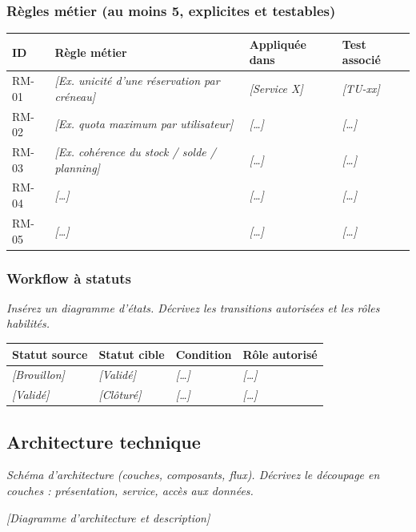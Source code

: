 \documentclass[11pt,a4paper]{article}
\newcommand{\ph}[1]{\textit{[#1]}}
\newcommand{\guide}[1]{\par{\small\itshape #1}\par\medskip}
\begin{document}
\subsubsection{R\`egles m\'etier (au moins 5, explicites et testables)}
\noindent\begin{tabularx}{\textwidth}{|L{1.5cm}|Y|L{3.2cm}|L{2.4cm}|}\hline
\textbf{ID} & \textbf{R\`egle m\'etier} & \textbf{Appliqu\'ee dans} & \textbf{Test associ\'e} \\ \hline
RM-01 & \ph{Ex. unicit\'e d'une r\'eservation par cr\'eneau} & \ph{Service X} & \ph{TU-xx} \\ \hline
RM-02 & \ph{Ex. quota maximum par utilisateur} & \ph{\dots} & \ph{\dots} \\ \hline
RM-03 & \ph{Ex. coh\'erence du stock / solde / planning} & \ph{\dots} & \ph{\dots} \\ \hline
RM-04 & \ph{\dots} & \ph{\dots} & \ph{\dots} \\ \hline
RM-05 & \ph{\dots} & \ph{\dots} & \ph{\dots} \\ \hline
\end{tabularx}

\subsubsection{Workflow \`a statuts}
\guide{Ins\'erez un diagramme d'\'etats. D\'ecrivez les transitions autoris\'ees et les r\^oles habilit\'es.}
\noindent\begin{tabularx}{\textwidth}{|L{3cm}|L{3cm}|Y|L{3cm}|}\hline
\textbf{Statut source} & \textbf{Statut cible} & \textbf{Condition} & \textbf{R\^ole autoris\'e} \\ \hline
\ph{Brouillon} & \ph{Valid\'e} & \ph{\dots} & \ph{\dots} \\ \hline
\ph{Valid\'e} & \ph{Cl\^otur\'e} & \ph{\dots} & \ph{\dots} \\ \hline
\end{tabularx}

\subsection{Architecture technique}
\guide{Sch\'ema d'architecture (couches, composants, flux). D\'ecrivez le d\'ecoupage en couches : pr\'esentation, service, acc\`es aux donn\'ees.}
\ph{Diagramme d'architecture et description}
\end{document}
